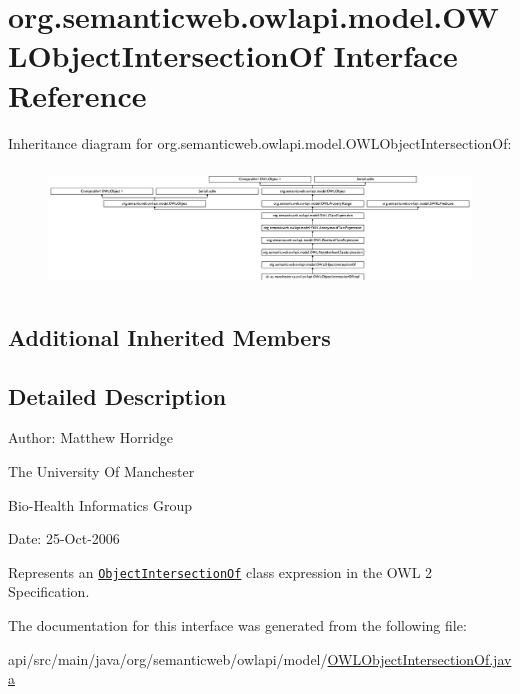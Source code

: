 \hypertarget{interfaceorg_1_1semanticweb_1_1owlapi_1_1model_1_1_o_w_l_object_intersection_of}{\section{org.\-semanticweb.\-owlapi.\-model.\-O\-W\-L\-Object\-Intersection\-Of Interface Reference}
\label{interfaceorg_1_1semanticweb_1_1owlapi_1_1model_1_1_o_w_l_object_intersection_of}
}
Inheritance diagram for org.\-semanticweb.\-owlapi.\-model.\-O\-W\-L\-Object\-Intersection\-Of\-:\begin{figure}[H]
\begin{center}
\leavevmode
\includegraphics[height=3.222507cm]{interfaceorg_1_1semanticweb_1_1owlapi_1_1model_1_1_o_w_l_object_intersection_of}
\end{center}
\end{figure}
\subsection*{Additional Inherited Members}


\subsection{Detailed Description}
Author\-: Matthew Horridge\par
 The University Of Manchester\par
 Bio-\/\-Health Informatics Group\par
 Date\-: 25-\/\-Oct-\/2006\par
\par
 

Represents an \href{http://www.w3.org/TR/2009/REC-owl2-syntax-20091027/#Intersection_of_Class_Expressions}{\tt Object\-Intersection\-Of} class expression in the O\-W\-L 2 Specification. 

The documentation for this interface was generated from the following file\-:\begin{DoxyCompactItemize}
\item 
api/src/main/java/org/semanticweb/owlapi/model/\hyperlink{_o_w_l_object_intersection_of_8java}{O\-W\-L\-Object\-Intersection\-Of.\-java}\end{DoxyCompactItemize}
